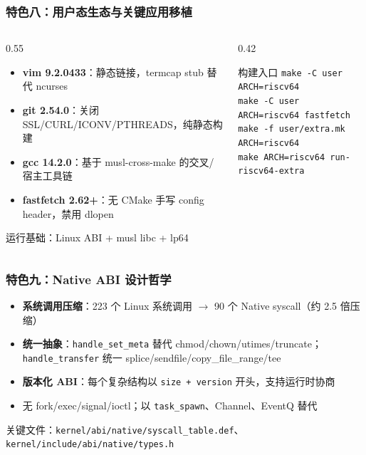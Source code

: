 \documentclass[aspectratio=1610]{beamer}
\newcommand{\code}[1]{\texttt{\footnotesize #1}}
\newcommand{\high}[1]{\textbf{\textcolor{ThemeColor}{#1}}}
\begin{document}
\begin{frame}
    \frametitle{特色八：用户态生态与关键应用移植}
    \begin{columns}
        \begin{column}{0.55\textwidth}
            \footnotesize
            \begin{itemize}
                \item \high{vim 9.2.0433}：静态链接，termcap stub 替代 ncurses
                \item \high{git 2.54.0}：关闭 SSL/CURL/ICONV/PTHREADS，纯静态构建
                \item \high{gcc 14.2.0}：基于 musl-cross-make 的交叉/宿主工具链
                \item \high{fastfetch 2.62+}：无 CMake 手写 config header，禁用 dlopen
            \end{itemize}
            \vspace{0.3em}
            \small 运行基础：Linux ABI + musl libc + lp64
        \end{column}
        \begin{column}{0.42\textwidth}
            \footnotesize
            \begin{block}{构建入口}
                \code{make -C user ARCH=riscv64}\\
                \code{make -C user ARCH=riscv64 fastfetch}\\
                \code{make -f user/extra.mk ARCH=riscv64}\\
                \code{make ARCH=riscv64 run-riscv64-extra}
            \end{block}
        \end{column}
    \end{columns}
\end{frame}

\begin{frame}
    \frametitle{特色九：Native ABI 设计哲学}
    \begin{itemize}
        \item \high{系统调用压缩}：223 个 Linux 系统调用 $\rightarrow$ 90 个 Native syscall（约 2.5 倍压缩）
        \item \high{统一抽象}：\code{handle\_set\_meta} 替代 chmod/chown/utimes/truncate；\code{handle\_transfer} 统一 splice/sendfile/copy\_file\_range/tee
        \item \high{版本化 ABI}：每个复杂结构以 \code{size + version} 开头，支持运行时协商
        \item 无 fork/exec/signal/ioctl；以 \code{task\_spawn}、Channel、EventQ 替代
    \end{itemize}
    \vspace{0.3em}
    \small 关键文件：\code{kernel/abi/native/syscall\_table.def}、\code{kernel/include/abi/native/types.h}
\end{frame}
\end{document}
